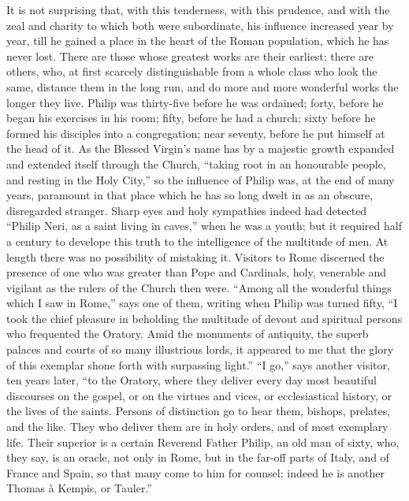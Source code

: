 It is not surprising that, with this tenderness, with
this prudence, and with the zeal and charity to which
both were subordinate, his influence increased year by
year, till he gained a place in the heart of the Roman
population, which he has never lost. There are those
whose greatest works are their earliest; there are
others, who, at first scarcely distinguishable from a
whole class who look the same, distance them in the long
run, and do more and more wonderful works the longer they
live. Philip was thirty-five before he was ordained;
forty, before he began his exercises in his room; fifty,
before he had a church; sixty before he formed his
disciples into a congregation; near seventy, before he
put himself at the head of it. As the Blessed Virgin's
name has by a majestic growth expanded and extended
itself through the Church, ``taking root in an
honourable people, and resting in the Holy City,'' so
the influence of Philip was, at the end of many years,
paramount in that place which he has so long dwelt in as
an obscure, disregarded stranger. Sharp eyes and holy
sympathies indeed had detected ``Philip Neri, as a
saint living in caves,'' when he was a youth; but it
required half a century to develope this truth to the
intelligence of the multitude of men. At length there was
no possibility of mistaking it. Visitors to Rome
discerned the presence of one who was greater than Pope
and Cardinals, holy, venerable and vigilant as the rulers
of the Church then were. ``Among all the wonderful
things which I saw in Rome,'' says one of them,
writing when Philip was turned fifty, ``I took the
chief pleasure in beholding the multitude of devout and
spiritual persons who frequented the Oratory. Amid the monuments of antiquity, the superb palaces and courts of
so many illustrious lords, it appeared to me that the
glory of this exemplar shone forth with surpassing
light.'' ``I go,'' says another visitor, ten
years later, ``to the Oratory, where they deliver
every day most beautiful discourses on the gospel, or on
the virtues and vices, or ecclesiastical history, or the
lives of the saints. Persons of distinction go to hear
them, bishops, prelates, and the like. They who deliver
them are in holy orders, and of most exemplary life.
Their superior is a certain Reverend Father Philip, an
old man of sixty, who, they say, is an oracle, not only
in Rome, but in the far-off parts of Italy, and of France
and Spain, so that many come to him for counsel; indeed
he is another Thomas à
Kempis, or
Tauler.''

